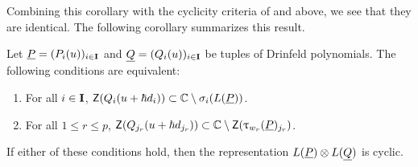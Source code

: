 Combining this corollary with the cyclicity criteria of \cite{gautam_poles_2023} and \cite{tan_braid_2015} above, we see that they are identical.
The following corollary summarizes this result.

\begin{corollary}\label{C:cyclicity}
    Let $\underline{P} = (P_i(u))_{i\in\mathbf{I}}$ and $\underline{Q} = (Q_i(u))_{i\in\mathbf{I}}$ be tuples of Drinfeld polynomials.
    The following conditions are equivalent:
    \begin{enumerate}
        \item For all $i\in\mathbf{I}$, $\mathsf{Z}(Q_i(u+\hbar d_i))\subset\mathbb{C}\setminus\sigma_i(L(\underline{P}))$.
        \item For all $1\leq r\leq p$, $\mathsf{Z}(Q_{j_r}(u+\hbar d_{j_r}))\subset\mathbb{C}\setminus\mathsf{Z}(\uptau_{w_r}(\underline{P})_{j_r})$.
    \end{enumerate}
    If either of these conditions hold, then the representation $L(\underline{P})\otimes L(\underline{Q})$ is cyclic.
\end{corollary}
